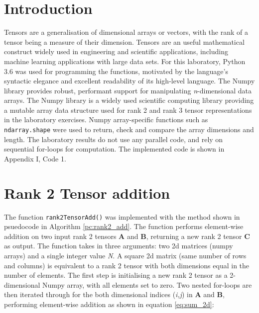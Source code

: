 \documentclass[10 pt, conference]{cssconf}
\begin{document}
\section*{Introduction}
Tensors are a generalisation of dimensional arrays or vectors, with the rank of a tensor being a measure of their dimension. Tensors are an useful mathematical construct widely used in engineering and scientific applications, including machine learning applications with large data sets. For this laboratory, Python 3.6 was used for programming the functions, motivated by the language's syntactic elegance and excellent readability of its high-level language. The Numpy library provides robust, performant support for manipulating \textit{n}-dimensional data arrays. The Numpy library is a widely used scientific computing library providing a mutable array data structure used for rank 2 and rank 3 tensor representations in the laboratory exercises. Numpy array-specific functions such as \verb|ndarray.shape| were used to return, check and compare the array dimensions and length. The laboratory results do not use any parallel code, and rely on sequential for-loops for computation. The implemented code is shown in Appendix I, Code 1.%


\setcounter{section}{0}
\section{Rank 2 Tensor addition}
The function \verb|rank2TensorAdd()| was implemented with the method shown in psuedocode in Algorithm \ref{pc:rank2_add}. The function performs element-wise addition on two input rank 2 tensors $\mathbf{A}$ and $\mathbf{B}$, returning a new rank 2 tensor $\mathbf{C}$ as output. The function takes in three arguments: two 2d matrices (numpy arrays) and a single integer value \textit{N}. A square 2d matrix (same number of rows and columns) is equivalent to a rank 2 tensor with both dimensions equal in the number of elements. The first step is initialising a new rank 2 tensor as a 2-dimensional Numpy array, with all elements set to zero. Two nested for-loops are then iterated through for the both dimensional indices (\textit{i,j}) in $\mathbf{A}$ and $\mathbf{B}$, performing element-wise addition as shown in equation \ref{eq:sum_2d}:
\end{document}

